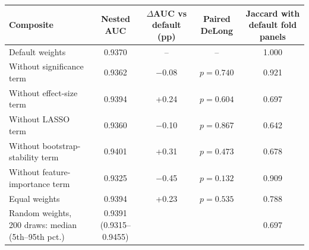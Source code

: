 \begin{tabular}{lcccc}
\toprule
Composite & Nested AUC & $\Delta$AUC vs default (pp) & Paired DeLong & Jaccard with default fold panels \\
\midrule
Default weights & 0.9370 & -- & -- & 1.000 \\
Without significance term & 0.9362 & $-$0.08 & $p = 0.740$ & 0.921 \\
Without effect-size term & 0.9394 & +0.24 & $p = 0.604$ & 0.697 \\
Without LASSO term & 0.9360 & $-$0.10 & $p = 0.867$ & 0.642 \\
Without bootstrap-stability term & 0.9401 & +0.31 & $p = 0.473$ & 0.678 \\
Without feature-importance term & 0.9325 & $-$0.45 & $p = 0.132$ & 0.909 \\
Equal weights & 0.9394 & +0.23 & $p = 0.535$ & 0.788 \\
Random weights, 200 draws: median (5th--95th pct.) & 0.9391 (0.9315--0.9455) & & & 0.697 \\
\bottomrule
\end{tabular}
